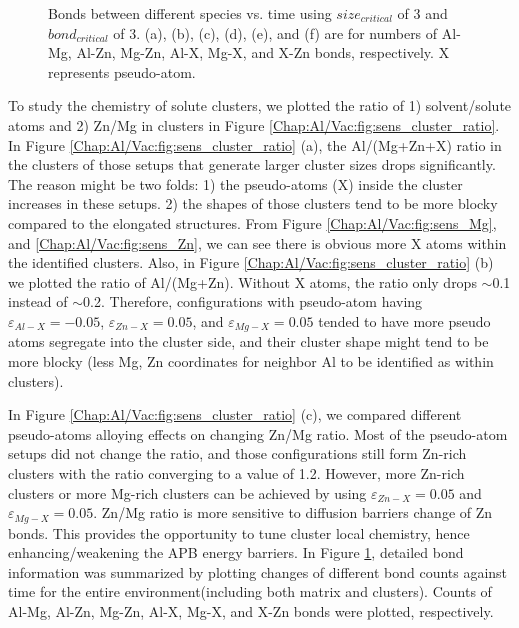\begin{figure}[!ht]
\caption[Bonds between different species vs. time using $size_{critical}$ of 3 and $bond_{critical}$ of 3.]{Bonds between different species vs. time using $size_{critical}$ of 3 and $bond_{critical}$ of 3. (a), (b), (c), (d), (e), and (f) are for numbers of Al-Mg, Al-Zn, Mg-Zn, Al-X, Mg-X, and X-Zn bonds, respectively. X represents pseudo-atom.}
\label{Chap:Al/Vac:fig:sens_bond}
\end{figure}
\endgroup


To study the chemistry of solute clusters, we plotted the ratio of 1) solvent/solute atoms and 2) Zn/Mg in clusters in Figure \ref{Chap:Al/Vac:fig:sens_cluster_ratio}. In Figure \ref{Chap:Al/Vac:fig:sens_cluster_ratio} (a), the Al/(Mg+Zn+X) ratio in the clusters of those setups that generate larger cluster sizes drops significantly. The reason might be two folds: 1) the pseudo-atoms (X) inside the cluster increases in these setups. 2) the shapes of those clusters tend to be more blocky compared to the elongated structures. From Figure \ref{Chap:Al/Vac:fig:sens_Mg}, and \ref{Chap:Al/Vac:fig:sens_Zn}, we can see there is obvious more X atoms within the identified clusters. Also, in Figure \ref{Chap:Al/Vac:fig:sens_cluster_ratio} (b) we plotted the ratio of Al/(Mg+Zn). Without X atoms, the ratio only drops $\sim$0.1 instead of $\sim$0.2. Therefore, configurations with pseudo-atom having  $\varepsilon_{Al-X} = -0.05$, $\varepsilon_{Zn-X} = 0.05$, and $\varepsilon_{Mg-X} = 0.05$ tended to have more pseudo atoms segregate into the cluster side, and their cluster shape might tend to be more blocky (less Mg, Zn coordinates for neighbor Al to be identified as within clusters).


In Figure \ref{Chap:Al/Vac:fig:sens_cluster_ratio} (c), we compared different pseudo-atoms alloying effects on changing Zn/Mg ratio. Most of the pseudo-atom setups did not change the ratio, and those configurations still form Zn-rich clusters with the ratio converging to a value of 1.2. However, more Zn-rich clusters or more Mg-rich clusters can be achieved by using $\varepsilon_{Zn-X} = 0.05$ and $\varepsilon_{Mg-X} = 0.05$. Zn/Mg ratio is more sensitive to diffusion barriers change of Zn bonds. This provides the opportunity to tune cluster local chemistry, hence enhancing/weakening the APB energy barriers. In Figure \ref{Chap:Al/Vac:fig:sens_bond}, detailed bond information was summarized by plotting changes of different bond counts against time for the entire environment(including both matrix and clusters). Counts of Al-Mg, Al-Zn, Mg-Zn, Al-X, Mg-X, and X-Zn bonds were plotted, respectively.


